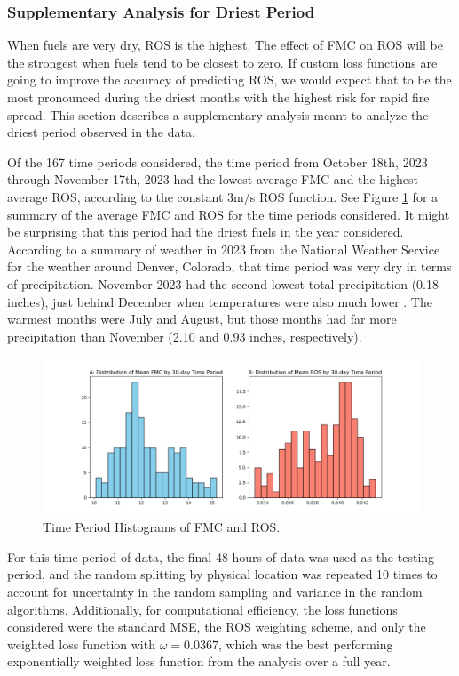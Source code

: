 \documentclass[11pt]{article}%
\begin{document}
\subsubsection{Supplementary Analysis for Driest Period}
\hfill

When fuels are very dry, ROS is the highest. The effect of FMC on ROS will be the strongest when fuels tend to be closest to zero. If custom loss functions are going to improve the accuracy of predicting ROS, we would expect that to be the most pronounced during the driest months with the highest risk for rapid fire spread. This section describes a supplementary analysis meant to analyze the driest period observed in the data. 

Of the 167 time periods considered, the time period from October 18th, 2023 through November 17th, 2023 had the lowest average FMC and the highest average ROS, according to the constant 3m/s ROS function. See Figure \ref{fig:dry} for a summary of the average FMC and ROS for the time periods considered. It might be surprising that this period had the driest fuels in the year considered. According to a summary of weather in 2023 from the National Weather Service for the weather around Denver, Colorado, that time period was very dry in terms of precipitation. November 2023 had the second lowest total precipitation (0.18 inches), just behind December when temperatures were also much lower \citep{NWS-2023-DAC}. The warmest months were July and August, but those months had far more precipitation than November  (2.10 and 0.93 inches, respectively). 

\begin{figure}[ht]
    \centering
    \includegraphics[width=1\textwidth]{images/dry.png}
    \caption{Time Period Histograms of FMC and ROS.}
    \label{fig:dry}
\end{figure}

For this time period of data, the final 48 hours of data was used as the testing period, and the random splitting by physical location was repeated 10 times to account for uncertainty in the random sampling and variance in the random algorithms. Additionally, for computational efficiency, the loss functions considered were the standard MSE, the ROS weighting scheme, and only the weighted loss function with $\omega = 0.0367$, which was the best performing exponentially weighted loss function from the analysis over a full year.
\end{document}
